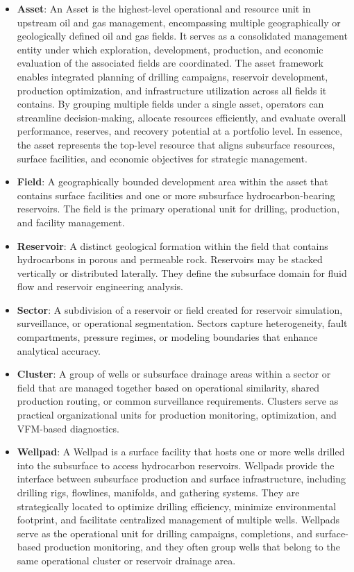 \documentclass[12pt,APA]{uomthesis}
\begin{document}
\begin{itemize}
    \item \textbf{Asset}: An Asset is the highest-level operational and resource unit in upstream oil and gas management, encompassing multiple geographically or geologically defined oil and gas fields. It serves as a consolidated management entity under which exploration, development, production, and economic evaluation of the associated fields are coordinated. The asset framework enables integrated planning of drilling campaigns, reservoir development, production optimization, and infrastructure utilization across all fields it contains. By grouping multiple fields under a single asset, operators can streamline decision-making, allocate resources efficiently, and evaluate overall performance, reserves, and recovery potential at a portfolio level. In essence, the asset represents the top-level resource that aligns subsurface resources, surface facilities, and economic objectives for strategic management.
    \item \textbf{Field}: A geographically bounded development area within the asset that contains surface facilities and one or more subsurface hydrocarbon-bearing reservoirs. The field is the primary operational unit for drilling, production, and facility management.
    \item \textbf{Reservoir}: A distinct geological formation within the field that contains hydrocarbons in porous and permeable rock. Reservoirs may be stacked vertically or distributed laterally. They define the subsurface domain for fluid flow and reservoir engineering analysis.
    \item \textbf{Sector}: A subdivision of a reservoir or field created for reservoir simulation, surveillance, or operational segmentation. Sectors capture heterogeneity, fault compartments, pressure regimes, or modeling boundaries that enhance analytical accuracy.
    \item \textbf{Cluster}: A group of wells or subsurface drainage areas within a sector or field that are managed together based on operational similarity, shared production routing, or common surveillance requirements. Clusters serve as practical organizational units for production monitoring, optimization, and VFM-based diagnostics.
    \item \textbf{Wellpad}: A Wellpad is a surface facility that hosts one or more wells drilled into the subsurface to access hydrocarbon reservoirs. Wellpads provide the interface between subsurface production and surface infrastructure, including drilling rigs, flowlines, manifolds, and gathering systems. They are strategically located to optimize drilling efficiency, minimize environmental footprint, and facilitate centralized management of multiple wells. Wellpads serve as the operational unit for drilling campaigns, completions, and surface-based production monitoring, and they often group wells that belong to the same operational cluster or reservoir drainage area.

\end{itemize}
\end{document}
